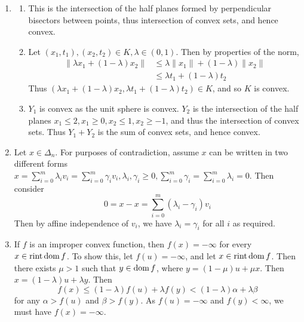 \begin{enumerate}[label*=Ex \arabic*.]
\item \label{item:2}
  \begin{enumerate}
  \item This is the intersection of the half planes formed by
    perpendicular bisectors between points, thus intersection of
    convex sets, and hence convex.
  \item Let $(x_{1}, t_{1}), (x_{2}, t_{2}) \in K, \lambda \in (0,
    1)$. Then by properties of the norm,
    \begin{align}
      \label{eq:10}
      \| \lambda x_{1} + (1-\lambda) x_{2} \| &\leq \lambda \| x_{1}
      \| + (1-\lambda) \| x_{2} \| \\
      &\leq \lambda t_{1} + (1-\lambda) t_{2}
    \end{align}  Thus $(\lambda x_{1} + (1-\lambda) x_{2}, \lambda
    t_{1} + (1-\lambda) t_{2}) \in K$, and so $K$ is convex.
  \item $Y_{1}$ is convex as the unit sphere is convex.  $Y_{2}$ is
    the intersection of the half planes $x_{1} \leq 2, x_{1} \geq 0,
    x_{2} \leq 1, x_{2} \geq -1$, and thus the intersection of convex
    sets. Thus $Y_{1} + Y_{2}$ is the sum of convex sets, and hence convex.
  \end{enumerate}
\item \label{item:3} Let $x \in \Delta_{n}$. For purposes of
  contradiction, assume $x$ can be written in two different forms $x =
  \sum_{i=0}^{m} \lambda_{i} v_{i} = \sum_{i=0}^{m} \gamma_{i} v_{i},
  \lambda_{i}, \gamma_{i} \geq 0, \sum_{i=0}^{m} \gamma_{i} =
  \sum_{i=0}^{m} \lambda_{i} = 0$. Then consider
  \begin{equation}
    \label{eq:12}
    0 = x - x =  \sum_{i=0}^{m} (\lambda_{i} - \gamma_{i}) v_{i}    
  \end{equation}
  Then by affine independence of $v_{i}$, we have $\lambda_{i} = \gamma_{i}$  for all
  $i$ as required.
  
\item \label{item:4}
  If $f$ is an improper convex function, then $f(x) = -\infty$ for
  every $x \in \operatorname*{rint} \operatorname*{dom} f$. To show this, let $f(u) = -\infty$, and
  let $x \in \operatorname*{rint} \operatorname*{dom} f$. Then there exists $\mu > 1$ such that $y
  \in \operatorname*{dom} f$, where $y = (1-\mu) u + \mu x$. Then $x = (1-\lambda) u
  + \lambda y$.  Then
  \begin{equation}
    \label{eq:16}
    f(x) \leq (1-\lambda)f(u) + \lambda f(y) < (1-\lambda) \alpha +
    \lambda \beta
  \end{equation} for any $\alpha > f(u)$ and $\beta > f(y)$.  As $f(u)
  = -\infty$ and $f(y) < \infty$, we must have $f(x) = -\infty$.


\end{enumerate}
